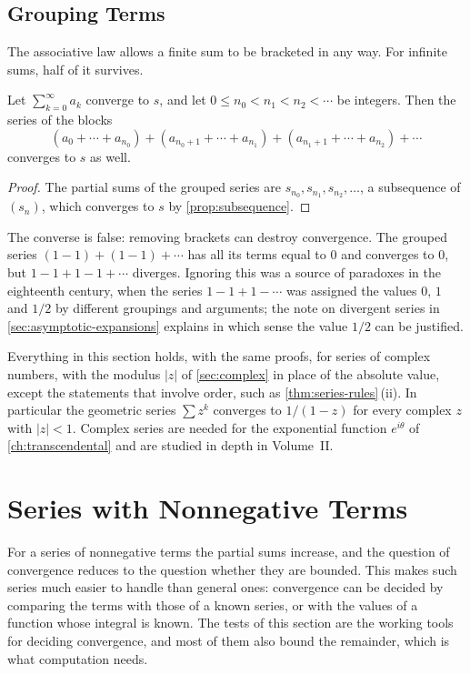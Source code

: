 \subsection{Grouping Terms}

The associative law allows a finite sum to be bracketed in any way. For infinite sums, half of it survives.

\begin{proposition}
\label{prop:grouping}
Let $\sum_{k=0}^\infty a_k$ converge to $s$, and let $0\le n_0<n_1<n_2<\cdots$ be integers. Then the series of the blocks
\[
(a_0+\cdots+a_{n_0})+(a_{n_0+1}+\cdots+a_{n_1})+(a_{n_1+1}+\cdots+a_{n_2})+\cdots
\]
converges to $s$ as well.
\end{proposition}

\begin{proof}
The partial sums of the grouped series are $s_{n_0},s_{n_1},s_{n_2},\ldots$, a subsequence of $(s_n)$, which converges to $s$ by \cref{prop:subsequence}.
\end{proof}

The converse is false: removing brackets can destroy convergence. The grouped series $(1-1)+(1-1)+\cdots$ has all its terms equal to $0$ and converges to $0$, but $1-1+1-1+\cdots$ diverges. Ignoring this was a source of paradoxes in the eighteenth century, when the series $1-1+1-\cdots$ was assigned the values $0$, $1$ and $1/2$ by different groupings and arguments; the note on divergent series in \cref{sec:asymptotic-expansions} explains in which sense the value $1/2$ can be justified.

Everything in this section holds, with the same proofs, for series of complex numbers, with the modulus $|z|$ of \cref{sec:complex} in place of the absolute value, except the statements that involve order, such as \cref{thm:series-rules}\,(ii). In particular the geometric series $\sum z^k$ converges to $1/(1-z)$ for every complex $z$ with $|z|<1$. Complex series are needed for the exponential function $e^{i\theta}$ of \cref{ch:transcendental} and are studied in depth in Volume~II.

\section{Series with Nonnegative Terms}
\label{sec:nonnegative-series}

For a series of nonnegative terms the partial sums increase, and the question of convergence reduces to the question whether they are bounded. This makes such series much easier to handle than general ones: convergence can be decided by comparing the terms with those of a known series, or with the values of a function whose integral is known. The tests of this section are the working tools for deciding convergence, and most of them also bound the remainder, which is what computation needs.

